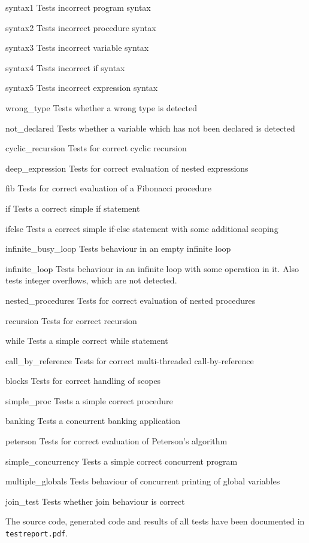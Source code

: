 \documentclass[twoside]{report}
\newenvironment{mycompactdesc}{\begin{adjustwidth}{0.53cm}{}\begin{compactdesc}}{\end{compactdesc}\end{adjustwidth}}
\begin{document}
\begin{mycompactdesc}
	\item[syntax1] Tests incorrect program syntax
	\item[syntax2] Tests incorrect procedure syntax
	\item[syntax3] Tests incorrect variable syntax
	\item[syntax4] Tests incorrect if syntax
	\item[syntax5] Tests incorrect expression syntax
	\item[wrong\_{}type] Tests whether a wrong type is detected
	\item[not\_{}declared] Tests whether a variable which has not been declared is detected
    \item[cyclic\_{}recursion] Tests for correct cyclic recursion
    \item[deep\_{}expression] Tests for correct evaluation of nested expressions
    \item[fib] Tests for correct evaluation of a Fibonacci procedure 
    \item[if] Tests a correct simple if statement
    \item[ifelse] Tests a correct simple if-else statement with some additional scoping
    \item[infinite\_{}busy\_{}loop] Tests behaviour in an empty infinite loop
    \item[infinite\_{}loop] Tests behaviour in an infinite loop with some operation in it. Also tests integer overflows, which are not detected.
    \item[nested\_{}procedures] Tests for correct evaluation of nested procedures
    \item[recursion] Tests for correct recursion
    \item[while] Tests a simple correct while statement
    \item[call\_{}by\_{}reference] Tests for correct multi-threaded call-by-reference
    \item[blocks] Tests for correct handling of scopes
    \item[simple\_{}proc] Tests a simple correct procedure
	\item[banking] Tests a concurrent banking application
    \item[peterson] Tests for correct evaluation of Peterson's algorithm
    \item[simple\_{}concurrency] Tests a simple correct concurrent program
    \item[multiple\_{}globals] Tests behaviour of concurrent printing of global variables
    \item[join\_{}test] Tests whether join behaviour is correct
\end{mycompactdesc}
The source code, generated code and results of all tests have been documented in \texttt{testreport.pdf}.
\end{document}
